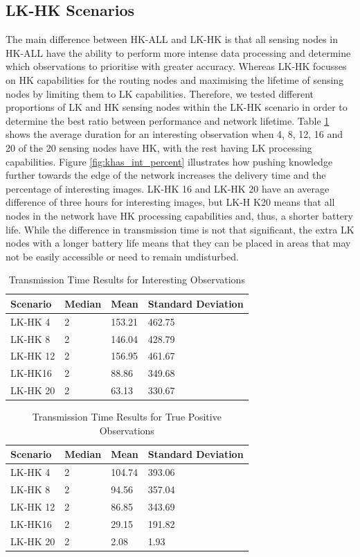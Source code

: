 \subsection{LK-HK Scenarios}

The main difference between HK-ALL and LK-HK is that all sensing nodes in HK-ALL have the ability to perform more intense data processing and determine which observations to prioritise with greater accuracy. Whereas LK-HK focusses on HK capabilities for the routing nodes and maximising the lifetime of sensing nodes by limiting them to LK capabilities. Therefore, we tested different proportions of LK and HK sensing nodes within the LK-HK scenario in order to determine the best ratio between performance and network lifetime. Table \ref{tab:khas_int} shows the average duration for an interesting observation when 4, 8, 12, 16 and 20 of the 20 sensing nodes have HK, with the rest having LK processing capabilities. Figure \ref{fig:khas_int_percent} illustrates how pushing knowledge further towards the edge of the network increases the delivery time and the percentage of interesting images. LK-HK 16 and LK-HK 20 have an average difference of three hours for interesting images, but LK-H K20 means that all nodes in the network have HK processing capabilities and, thus, a shorter battery life. While the difference in transmission time is not that significant, the extra LK nodes with a longer battery life means that they can be placed in areas that may not be easily accessible or need to remain undisturbed.

\begin{table}[h]\footnotesize
\begin{tabularx}{\textwidth}{ |X|X|X|X|}
\hline
Scenario & Median & Mean & Standard Deviation \\
\hline
LK-HK 4 & 2 & 153.21 & 462.75 \\
LK-HK 8 & 2 & 146.04 & 428.79 \\
LK-HK 12 & 2 & 156.95 & 461.67 \\
LK-HK16 & 2 & 88.86 & 349.68 \\
LK-HK 20 & 2 & 63.13 & 330.67 \\
\hline
\end{tabularx}
\caption{Transmission Time Results for Interesting Observations}\label{tab:khas_int}
\end{table}

\begin{table}[h]\footnotesize
\begin{tabularx}{\textwidth}{ |X|X|X|X|}
\hline
Scenario & Median & Mean & Standard Deviation \\
\hline
LK-HK 4 & 2 & 104.74 & 393.06 \\
LK-HK 8 & 2 & 94.56 & 357.04 \\
LK-HK 12 & 2 & 86.85 & 343.69 \\
LK-HK16 & 2 & 29.15 & 191.82 \\
LK-HK 20 & 2 & 2.08 & 1.93 \\
\hline
\end{tabularx}
\caption{Transmission Time Results for True Positive Observations}\label{tab:khas_tp}
\end{table}

